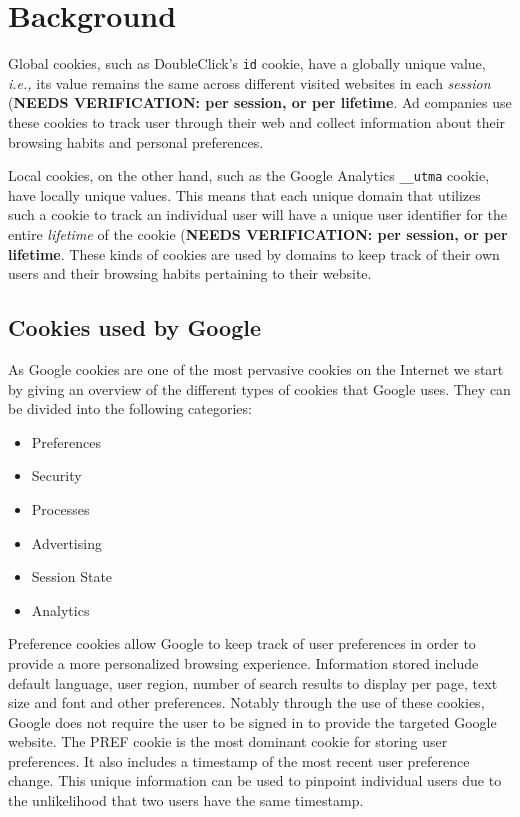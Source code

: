 \section{Background}
\label{sec:background}

Global cookies, such as DoubleClick's \texttt{id} cookie, have a globally unique value, \emph{i.e.,} its value remains the same across different visited websites in each \emph{session} (\textbf{NEEDS VERIFICATION: per session, or per lifetime}. 
Ad companies use these cookies to track user through their web and collect information about their browsing habits and personal preferences.

Local cookies, on the other hand, such as the Google Analytics \texttt{\_\_utma} cookie, have locally unique values.
This means that each unique domain that utilizes such a cookie to track an individual user will have a unique user identifier for the entire \emph{lifetime} of the cookie (\textbf{NEEDS VERIFICATION: per session, or per lifetime}.
These kinds of cookies are used by domains to keep track of their own users and their browsing habits pertaining to their website. 

\subsection{Cookies used by Google}
As Google cookies are one of the most pervasive cookies on the Internet we start by giving an overview of the different types of cookies that Google uses. They can be divided into the following categories:
\begin{itemize} \itemsep1pt \parskip0pt 

  \item Preferences
  \item Security
  \item Processes
  \item Advertising
  \item Session State
  \item Analytics

\end{itemize}

Preference cookies allow Google to keep track of user preferences in order to provide a more personalized browsing experience. Information stored include default language, user region, number of search results to display per page, text size and font and other preferences. Notably through the use of these cookies, Google does not require the user to be signed in to provide the targeted Google website. The PREF cookie is the most dominant cookie for storing user preferences. It also includes a timestamp of the most recent user preference change. This unique information can be used to pinpoint individual users due to the unlikelihood that two users have the same timestamp.

